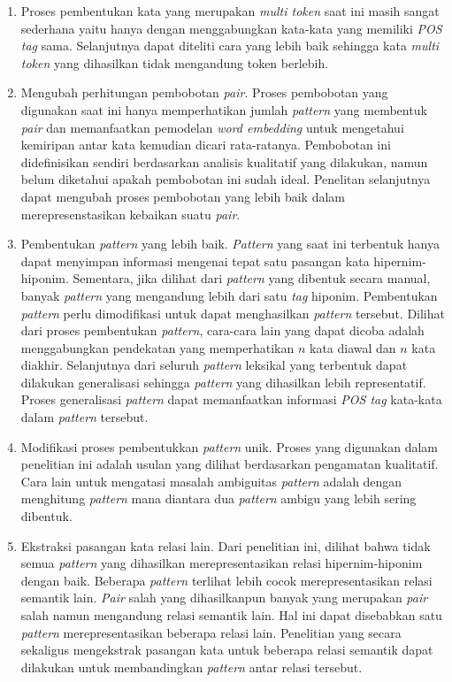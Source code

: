 \begin{enumerate}
  \item Proses pembentukan kata yang merupakan \textit{multi token} saat ini masih sangat sederhana yaitu hanya dengan menggabungkan kata-kata yang memiliki \textit{POS tag} sama. Selanjutnya dapat diteliti cara yang lebih baik sehingga kata \textit{multi token} yang dihasilkan tidak mengandung token berlebih.
  \item Mengubah perhitungan pembobotan \textit{pair}. Proses pembobotan yang digunakan saat ini hanya memperhatikan jumlah \textit{pattern} yang membentuk \textit{pair} dan memanfaatkan pemodelan \textit{word embedding} untuk mengetahui kemiripan antar kata kemudian dicari rata-ratanya. Pembobotan ini didefinisikan sendiri berdasarkan analisis kualitatif yang dilakukan, namun belum diketahui apakah pembobotan ini sudah ideal. Penelitan selanjutnya dapat mengubah proses pembobotan yang lebih baik dalam merepresenstasikan kebaikan suatu \textit{pair}.
  \item Pembentukan \textit{pattern} yang lebih baik. \textit{Pattern} yang saat ini terbentuk hanya dapat menyimpan informasi mengenai tepat satu pasangan kata hipernim-hiponim. Sementara, jika dilihat dari \textit{pattern} yang dibentuk secara manual, banyak \textit{pattern} yang mengandung lebih dari satu \textit{tag} hiponim. Pembentukan \textit{pattern} perlu dimodifikasi untuk dapat menghasilkan \textit{pattern} tersebut. Dilihat dari proses pembentukan \textit{pattern}, cara-cara lain yang dapat dicoba adalah menggabungkan pendekatan yang memperhatikan $n$ kata diawal dan $n$ kata diakhir. Selanjutnya dari seluruh \textit{pattern} leksikal yang terbentuk dapat dilakukan generalisasi sehingga \textit{pattern} yang dihasilkan lebih representatif. Proses generalisasi \textit{pattern} dapat memanfaatkan informasi \textit{POS tag} kata-kata dalam \textit{pattern} tersebut.
  \item Modifikasi proses pembentukkan \textit{pattern} unik. Proses yang digunakan dalam penelitian ini adalah usulan yang dilihat berdasarkan pengamatan kualitatif. Cara lain untuk mengatasi masalah ambiguitas \textit{pattern} adalah dengan menghitung \textit{pattern} mana diantara dua \textit{pattern} ambigu yang lebih sering dibentuk.
  \item Ekstraksi pasangan kata relasi lain. Dari penelitian ini, dilihat bahwa tidak semua \textit{pattern} yang dihasilkan merepresentasikan relasi hipernim-hiponim dengan baik. Beberapa \textit{pattern} terlihat lebih cocok merepresentasikan relasi semantik lain. \textit{Pair} salah yang dihasilkanpun banyak yang merupakan \textit{pair} salah namun mengandung relasi semantik lain. Hal ini dapat disebabkan satu \textit{pattern} merepresentasikan beberapa relasi lain. Penelitian yang secara sekaligus mengekstrak pasangan kata untuk beberapa relasi semantik dapat dilakukan untuk membandingkan \textit{pattern} antar relasi tersebut.

\end{enumerate}
